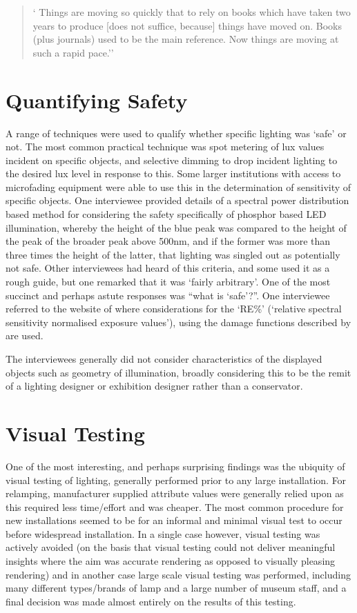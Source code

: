 \begin{quote}
`   Things are moving so quickly that to rely on books which have taken two years to produce [does not suffice, because] things have moved on. Books (plus journals) used to be the main reference. Now things are moving at such a rapid pace.''
\end{quote}

\section{Quantifying Safety}
A range of techniques were used to qualify whether specific lighting was `safe' or not. The most common practical technique was spot metering of lux values incident on specific objects, and selective dimming to drop incident lighting to the desired lux level in response to this. Some larger institutions with access to microfading equipment were able to use this in the determination of sensitivity of specific objects. One interviewee provided details of a spectral power distribution based method for considering the safety specifically of phosphor based \gls{LED} illumination, whereby the height of the blue peak was compared to the height of the peak of the broader peak above 500nm, and if the former was more than three times the height of the latter, that lighting was singled out as potentially not safe. Other interviewees had heard of this criteria, and some used it as a rough guide, but one remarked that it was `fairly arbitrary'. One of the most succinct and perhaps astute responses was ``what is `safe'?''. One interviewee referred to the website of \citet{padfield_relative_2012} where considerations for the `RE\%' (`relative spectral sensitivity normalised exposure values'), using the damage functions described by \citet{aydinli_deterioration_1990} are used.

The interviewees generally did not consider characteristics of the displayed objects such as geometry of illumination, broadly considering this to be the remit of a lighting designer or exhibition designer rather than a conservator.

\section{Visual Testing}
One of the most interesting, and perhaps surprising findings was the ubiquity of visual testing of lighting, generally performed prior to any large installation. For relamping, manufacturer supplied attribute values were generally relied upon as this required less time/effort and was cheaper. The most common procedure for new installations seemed to be for an informal and minimal visual test to occur before widespread installation. In a single case however, visual testing was actively avoided (on the basis that visual testing could not deliver meaningful insights where the aim was accurate rendering as opposed to visually pleasing rendering) and in another case large scale visual testing was performed, including many different types/brands of lamp and a large number of museum staff, and a final decision was made almost entirely on the results of this testing.

